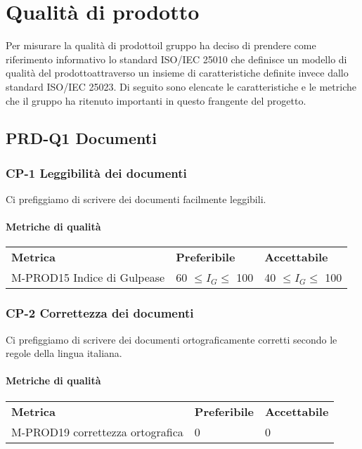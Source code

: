 \section{Qualità di prodotto}
    Per misurare la qualità di prodotto\glosp il gruppo ha deciso di prendere come riferimento informativo lo standard ISO/IEC 25010 che definisce un modello di qualità del prodotto\glosp attraverso un insieme di caratteristiche definite invece dallo standard ISO/IEC 25023. Di seguito sono elencate le caratteristiche e le metriche che il gruppo ha ritenuto importanti in questo frangente del progetto\glo.
    \subsection{PRD-Q1 Documenti}
    	\subsubsection{CP-1 Leggibilità dei documenti}
    		Ci prefiggiamo di scrivere dei documenti facilmente leggibili.
	    \paragraph{Metriche di qualità}
	    \begin{longtable} {
	    		>{}p{80mm} 
	    		>{}p{25mm}
	    		>{}p{25mm}
	    	}
	    	\rowcolor{gray!50}
	    	\textbf{Metrica} & \textbf{Preferibile} & \textbf{Accettabile} \TBstrut \TBstrut \\
	    	M-PROD15 Indice di Gulpease & 60 $\le I_{G} \le$ 100 & 40 $\le I_{G} \le$ 100 \TBstrut \\ [2mm]
	    \end{longtable}
    	\subsubsection{CP-2 Correttezza dei documenti}
    		Ci prefiggiamo di scrivere dei documenti ortograficamente corretti secondo le regole della lingua italiana.
    	\paragraph{Metriche di qualità}
    	\begin{longtable} {
    			>{}p{80mm} 
    			>{}p{25mm}
    			>{}p{25mm}
    		}
    		\rowcolor{gray!50}
    		\textbf{Metrica} & \textbf{Preferibile} & \textbf{Accettabile} \TBstrut \TBstrut \\
    		M-PROD19 correttezza ortografica & 0 & 0 \TBstrut \\ [2mm]
    	\end{longtable}
    	

